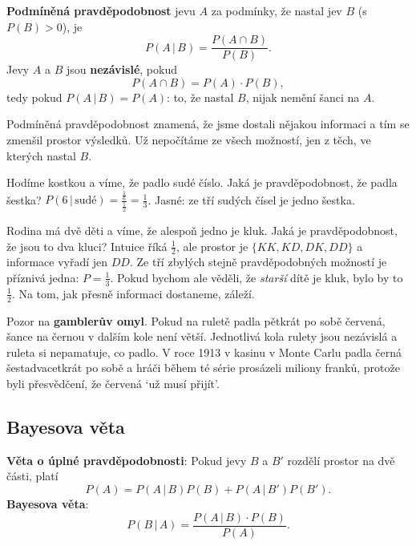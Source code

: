 \begin{definitionbox}
  \textbf{Podmíněná pravděpodobnost} jevu $A$ za podmínky, že nastal jev $B$ (s $P(B) > 0$), je
  \begin{equation*}
    P(A\,|\,B) = \frac{P(A\cap B)}{P(B)}.
  \end{equation*}
  Jevy $A$ a $B$ jsou \textbf{nezávislé}, pokud
  \begin{equation*}
    P(A\cap B) = P(A)\cdot P(B),
  \end{equation*}
  tedy pokud $P(A\,|\,B) = P(A)$: to, že nastal $B$, nijak nemění šanci na $A$.
\end{definitionbox}

Podmíněná pravděpodobnost znamená, že jsme dostali nějakou informaci a tím se zmenšil prostor výsledků. Už nepočítáme ze všech možností, jen z těch, ve kterých nastal $B$.

\begin{example}
  Hodíme kostkou a víme, že padlo sudé číslo. Jaká je pravděpodobnost, že padla šestka? $P(6\,|\,\text{sudé}) = \frac{\frac{1}{6}}{\frac{1}{2}} = \frac{1}{3}$. Jasné: ze tří sudých čísel je jedno šestka.
\end{example}

\begin{example}
  Rodina má dvě děti a víme, že alespoň jedno je kluk. Jaká je pravděpodobnost, že jsou to dva kluci? Intuice říká $\frac{1}{2}$, ale prostor je $\{KK, KD, DK, DD\}$ a informace vyřadí jen $DD$. Ze tří zbylých stejně pravděpodobných možností je příznivá jedna: $P = \frac{1}{3}$. Pokud bychom ale věděli, že \textit{starší} dítě je kluk, bylo by to $\frac{1}{2}$. Na tom, jak přesně informaci dostaneme, záleží.
\end{example}

\begin{note}
  Pozor na \textbf{gamblerův omyl}. Pokud na ruletě padla pětkrát po sobě červená, šance na černou v dalším kole není větší. Jednotlivá kola rulety jsou nezávislá a ruleta si nepamatuje, co padlo. V roce 1913 v kasinu v Monte Carlu padla černá šestadvacetkrát po sobě a hráči během té série prosázeli miliony franků, protože byli přesvědčení, že červená `už musí přijít'.
\end{note}

\subsection{Bayesova věta}\label{sec:bayesova-veta}

\begin{definitionbox}
  \textbf{Věta o úplné pravděpodobnosti}: Pokud jevy $B$ a $B'$ rozdělí prostor na dvě části, platí
  \begin{equation*}
    P(A) = P(A\,|\,B)P(B) + P(A\,|\,B')P(B').
  \end{equation*}
  \textbf{Bayesova věta}:
  \begin{equation*}
    P(B\,|\,A) = \frac{P(A\,|\,B)\cdot P(B)}{P(A)}.
  \end{equation*}
\end{definitionbox}

